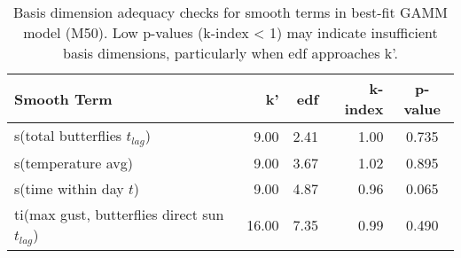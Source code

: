 \begin{table}[htbp]
\centering
\caption[Basis dimension adequacy checks (M50)]{Basis dimension adequacy checks for smooth terms in best-fit GAMM model (M50). Low p-values (k-index < 1) may indicate insufficient basis dimensions, particularly when edf approaches k'.}
\label{tab:gam_basis_check}
\begin{tabular}{lrrrc}
\toprule
Smooth Term & k' & edf & k-index & p-value \\
\midrule
s(total butterflies $t_{lag}$) & 9.00 & 2.41 & 1.00 & 0.735 \\
s(temperature avg) & 9.00 & 3.67 & 1.02 & 0.895 \\
s(time within day $t$) & 9.00 & 4.87 & 0.96 & 0.065 \\
ti(max gust, butterflies direct sun $t_{lag}$) & 16.00 & 7.35 & 0.99 & 0.490 \\
\bottomrule
\end{tabular}
\end{table}
